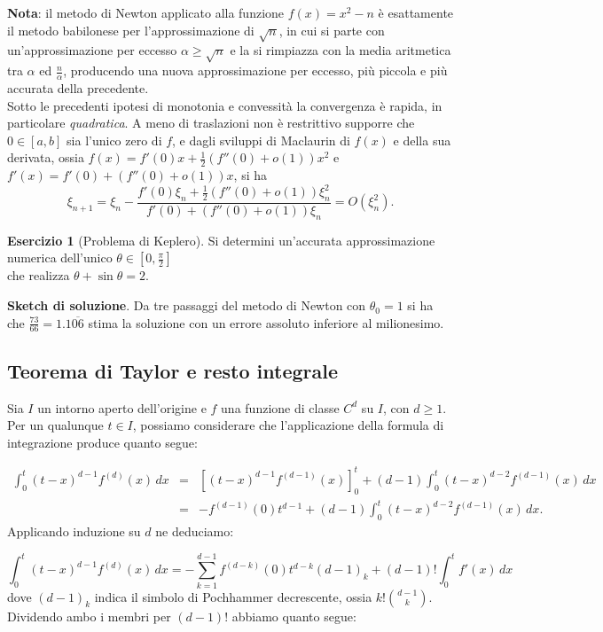 \documentclass[a4paper,twoside]{article}
\theoremstyle{definition}
\newtheorem{ex}[theorem]{Esercizio}
\numberwithin{theorem}{section}
\begin{document}
\textbf{Nota}: il metodo di Newton applicato alla funzione $f(x)=x^2-n$ è esattamente il metodo babilonese per l'approssimazione di $\sqrt{n}$, in cui si parte con un'approssimazione per eccesso $\alpha \geq \sqrt{n}$ e la si rimpiazza con la media aritmetica tra $\alpha$ ed $\frac{n}{\alpha}$, producendo una nuova approssimazione per eccesso, più piccola e più accurata della precedente.\\

Sotto le precedenti ipotesi di monotonia e convessità la convergenza è rapida, in particolare \emph{quadratica}. A meno di traslazioni non è restrittivo supporre che $0\in[a,b]$ sia l'unico zero di $f$, e dagli sviluppi di Maclaurin di $f(x)$ e della sua derivata, ossia $f(x)=f'(0)x + \frac{1}{2}(f''(0)+o(1))x^2$ e $f'(x)=f'(0)+(f''(0)+o(1))x$, si ha 
$$ \xi_{n+1} = \xi_n - \frac{f'(0)\xi_n + \frac{1}{2}(f''(0)+o(1))\xi_n^2}{f'(0)+(f''(0)+o(1))\xi_n} = O(\xi_n^2). $$

\begin{ex}[Problema di Keplero] Si determini un'accurata approssimazione numerica dell'unico $\theta\in\left[0,\frac{\pi}{2}\right]$\\ che realizza $\theta+\sin\theta = 2$. 
\end{ex}
\textbf{Sketch di soluzione}. Da tre passaggi del metodo di Newton con $\theta_0=1$ si ha che $\frac{73}{66}=1.1\overline{06}$ stima la soluzione con un errore assoluto inferiore al milionesimo.


\newpage

\subsection{Teorema di Taylor e resto integrale}
Sia $I$ un intorno aperto dell'origine e $f$ una funzione di classe $C^d$ su $I$, con $d\geq 1$. Per un qualunque $t\in I$, possiamo considerare che l'applicazione della formula di integrazione produce quanto segue:

\begin{eqnarray*} \int_{0}^{t} (t-x)^{d-1} f^{(d)}(x)\,dx &=&\left[(t-x)^{d-1} f^{(d-1)}(x)\right]_{0}^{t}+(d-1)\int_{0}^{t}(t-x)^{d-2}f^{(d-1)}(x)\,dx\\ &=&-f^{(d-1)}(0)t^{d-1}+(d-1)\int_{0}^{t}(t-x)^{d-2}f^{(d-1)}(x)\,dx. \end{eqnarray*}
Applicando induzione su $d$ ne deduciamo:

$$ \int_{0}^{t} (t-x)^{d-1} f^{(d)}(x)\,dx = -\sum_{k=1}^{d-1}f^{(d-k)}(0) t^{d-k}(d-1)_k + (d-1)!\int_{0}^{t}f'(x)\,dx $$
dove $(d-1)_k$ indica il simbolo di Pochhammer decrescente, ossia $k!\binom{d-1}{k}$.\\ Dividendo ambo i membri per $(d-1)!$ abbiamo quanto segue:
\end{document}

